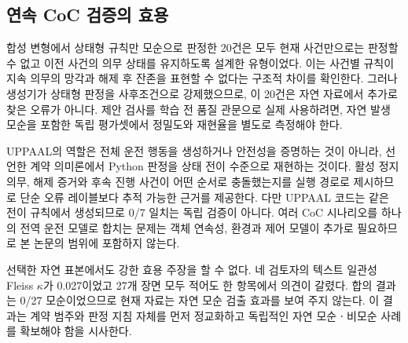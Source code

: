 \subsection{연속 CoC 검증의 효용}

합성 변형에서 상태형 규칙만 모순으로 판정한 20건은 모두 현재 사건만으로는 판정할 수 없고 이전 사건의 의무 상태를 유지하도록 설계한 유형이었다. 이는 사건별 규칙이 지속 의무의 망각과 해제 후 잔존을 표현할 수 없다는 구조적 차이를 확인한다. 그러나 생성기가 상태형 판정을 사후조건으로 강제했으므로, 이 20건은 자연 자료에서 추가로 찾은 오류가 아니다. 제안 검사를 학습 전 품질 관문으로 실제 사용하려면, 자연 발생 모순을 포함한 독립 평가셋에서 정밀도와 재현율을 별도로 측정해야 한다.

UPPAAL의 역할은 전체 운전 행동을 생성하거나 안전성을 증명하는 것이 아니라, 선언한 계약 의미론에서 Python 판정을 상태 전이 수준으로 재현하는 것이다. 활성 정지 의무, 해제 증거와 후속 진행 사건이 어떤 순서로 충돌했는지를 실행 경로로 제시하므로 단순 오류 레이블보다 추적 가능한 근거를 제공한다. 다만 UPPAAL 코드는 같은 전이 규칙에서 생성되므로 0/7 일치는 독립 검증이 아니다. 여러 CoC 시나리오를 하나의 전역 운전 모델로 합치는 문제는 객체 연속성, 환경과 제어 모델이 추가로 필요하므로 본 논문의 범위에 포함하지 않는다.

선택한 자연 표본에서도 강한 효용 주장을 할 수 없다. 네 검토자의 텍스트 일관성 Fleiss $\kappa$가 0.027이었고 27개 장면 모두 적어도 한 항목에서 의견이 갈렸다. 합의 결과는 0/27 모순이었으므로 현재 자료는 자연 모순 검출 효과를 보여 주지 않는다. 이 결과는 계약 범주와 판정 지침 자체를 먼저 정교화하고 독립적인 자연 모순ㆍ비모순 사례를 확보해야 함을 시사한다.
